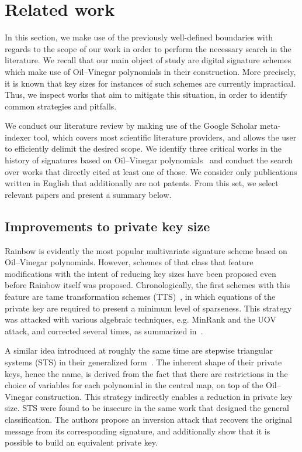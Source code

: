 \documentclass[12pt, a4paper, oneside]{memoir}
\theoremstyle{definition}
\begin{document}
\section{Related work}\label{sec:related}

In this section, we make use of the previously well-defined boundaries with regards to the scope of our work in order to perform the necessary search in the literature. We recall that our main object of study are digital signature schemes which make use of Oil--Vinegar polynomials in their construction. More precisely, it is known that key sizes for instances of such schemes are currently impractical. Thus, we inspect works that aim to mitigate this situation, in order to identify common strategies and pitfalls.

We conduct our literature review by making use of the Google Scholar meta-indexer tool, which covers most scientific literature providers, and allows the user to efficiently delimit the desired scope. We identify three critical works in the history of signatures based on Oil--Vinegar polynomials~\cite{Patarin:199709,Kipnis:199904,Ding:200506} and conduct the search over works that directly cited at least one of those. We consider only publications written in English that additionally are not patents. From this set, we select relevant papers and present a summary below.

\subsection{Improvements to private key size}\label{subsec:priv}

Rainbow is evidently the most popular multivariate signature scheme based on Oil--Vinegar polynomials. However, schemes of that class that feature modifications with the intent of reducing key sizes have been proposed even before Rainbow itself was proposed. Chronologically, the first schemes with this feature are tame transformation schemes (TTS)~\cite{Chen:200210}, in which equations of the private key are required to present a minimum level of sparseness. This strategy was attacked with various algebraic techniques, e.g. MinRank and the UOV attack, and corrected several times, as summarized in~\cite{Ding:200604}.

A similar idea introduced at roughly the same time are stepwise triangular systems (STS) in their generalized form~\cite{Wolf:200603}. The inherent shape of their private keys, hence the name, is derived from the fact that there are restrictions in the choice of variables for each polynomial in the central map, on top of the Oil--Vinegar construction. This strategy indirectly enables a reduction in private key size. STS were found to be insecure in the same work that designed the general classification. The authors propose an inversion attack that recovers the original message from its corresponding signature, and additionally show that it is possible to build an equivalent private key.
\end{document}
